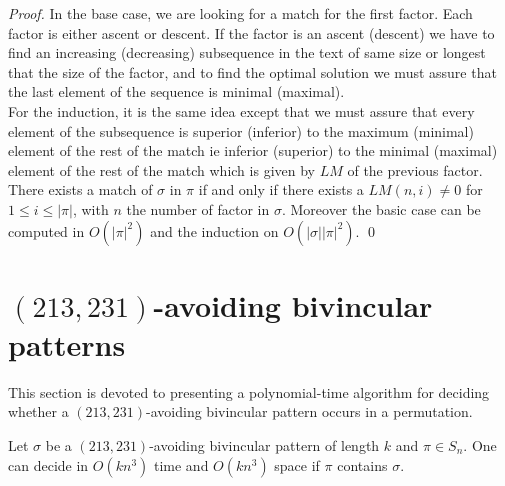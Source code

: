 \documentclass[a4paper]{llncs}
\newcommand{\ptext}{\pi}
\newcommand{\pmotif}{\sigma}
\newcounter{num}
\begin{document}
\begin{proof}
In the base case,
we are looking for a match for the first factor.
Each factor is either ascent or descent.
If the factor is an ascent (descent)
we have to find an increasing (decreasing) subsequence
in the text of same size or longest that
the size of the factor,
and to find the optimal solution
we must assure that the last element
of the sequence is minimal (maximal).\\
For the induction, it is the same idea
except that we must assure that
every element of the subsequence is superior (inferior)
to the maximum (minimal) element of the rest of the match
ie inferior (superior) to the minimal (maximal) element of the rest of the match
which is given by $LM$ of
the previous factor.\\

There exists a match of $\pmotif$ in $\ptext$ if and only if
there exists a $LM(n,i)\neq 0$ for $1 \leq i \leq |\ptext|$,
with $n$ the number of factor in $\pmotif$.
Moreover the basic case can be computed in $O(|\ptext|^2)$
and the induction on $O(|\pmotif||\ptext|^2)$.
\qed
\end{proof}


\section{$(213,231)$-avoiding bivincular patterns}
	\label{section:bivincular}

		This section is devoted to presenting a polynomial-time algorithm for deciding whether
	a $(213,231)$-avoiding bivincular pattern occurs in a permutation.

	\begin{proposition}
		\label{Proposition:bivincular pattern}
			Let $\sigma$ be a $(213,231)$-avoiding bivincular pattern of length $k$
			and $\pi \in S_n$.
			One can decide in $O(kn^3)$ time
			and $O(kn^3)$ space if $\pi$ contains $\sigma$.
	\end{proposition}
\end{document}

